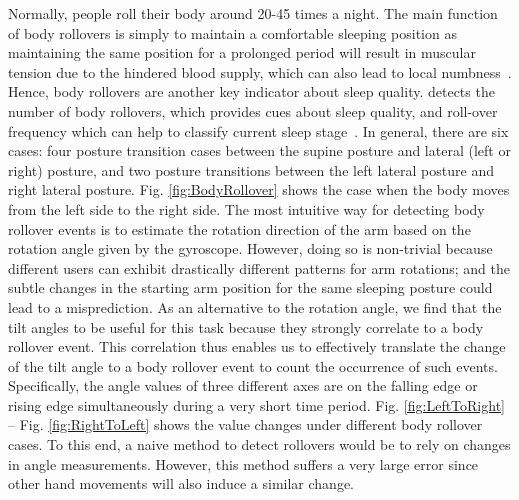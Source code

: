 Normally, people roll their body around 20-45 times a night. The main function of body rollovers is simply to
maintain a comfortable sleeping position as maintaining the same position for a prolonged period will result in muscular tension due to the hindered blood supply, which can also lead to local numbness~\cite{rollover2014}. Hence, body rollovers are another key indicator about sleep quality.   {{\systemname} detects the number of body rollovers, which provides cues about sleep quality, and roll-over frequency which can help to classify current sleep stage~\cite{rollover2007}}. In general, there are six cases: four posture transition cases between the supine posture and lateral (left or right) posture, and two posture transitions between the left lateral posture and right lateral posture. Fig. \ref{fig:BodyRollover} shows the case when the body moves from the left side to the right side.
The most intuitive way for detecting body rollover events is to estimate the rotation direction of the arm based on the
rotation angle given by the gyroscope. However, doing so is non-trivial because different users can exhibit drastically different patterns for arm rotations; and the subtle changes in the starting arm position for the same sleeping posture could lead to a misprediction. As an alternative to the rotation angle, we find that the tilt angles to be useful for this task because they strongly correlate to a body rollover event. This correlation thus enables us to effectively translate the change of the tilt angle to a body rollover event to count the occurrence of such events. Specifically, the angle values of three different axes are on the falling edge or rising edge simultaneously during a very short time period. Fig. \ref{fig:LeftToRight} -- Fig. \ref{fig:RightToLeft} shows the value changes under different body rollover cases. To this end, a naive method to detect rollovers would be to rely on changes in angle measurements. However, this method suffers a very large error since other hand movements will also induce a similar change.

